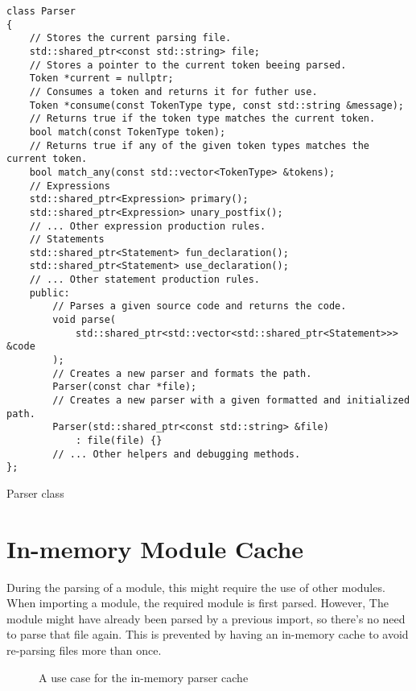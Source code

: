 \begin{listing}[H]
\begin{verbatim}
class Parser
{
    // Stores the current parsing file.
    std::shared_ptr<const std::string> file;
    // Stores a pointer to the current token beeing parsed.
    Token *current = nullptr;
    // Consumes a token and returns it for futher use.
    Token *consume(const TokenType type, const std::string &message);
    // Returns true if the token type matches the current token.
    bool match(const TokenType token);
    // Returns true if any of the given token types matches the current token.
    bool match_any(const std::vector<TokenType> &tokens);
    // Expressions
    std::shared_ptr<Expression> primary();
    std::shared_ptr<Expression> unary_postfix();
    // ... Other expression production rules.
    // Statements
    std::shared_ptr<Statement> fun_declaration();
    std::shared_ptr<Statement> use_declaration();
    // ... Other statement production rules.
    public:
        // Parses a given source code and returns the code.
        void parse(
            std::shared_ptr<std::vector<std::shared_ptr<Statement>>> &code
        );
        // Creates a new parser and formats the path.
        Parser(const char *file);
        // Creates a new parser with a given formatted and initialized path.
        Parser(std::shared_ptr<const std::string> &file)
            : file(file) {}
        // ... Other helpers and debugging methods.
};
\end{verbatim}
\caption{Parser class}
\label{ls:parser_class}
\end{listing}

\section{In-memory Module Cache}

During the parsing of a module, this might require the use of other modules. When importing a module, the required module is first
parsed. However, The module might have already been parsed by a previous import, so there's no need to parse that file again. This is prevented
by having an in-memory cache to avoid re-parsing files more than once.

\begin{figure}[H]
    \centering

    \caption{A use case for the in-memory parser cache}
    \label{fig:module_mem_cache}
\end{figure}

